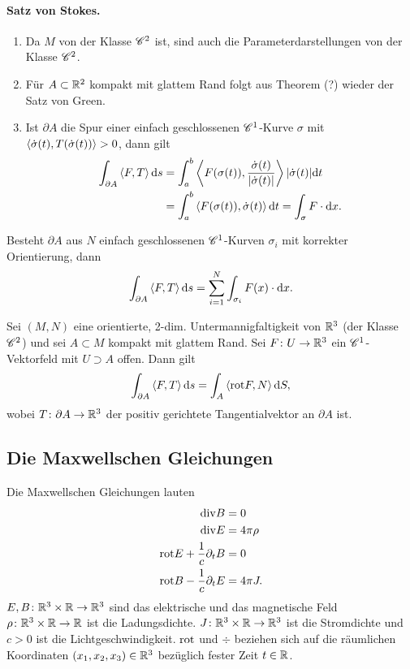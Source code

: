 \paragraph{Satz von Stokes. } 
\begin{rem}
	\begin{enumerate}[label=(\arabic*)]
		\item Da $M$ von der Klasse $\mathscr{C}^2$ ist, sind auch die Parameterdarstellungen von der Klasse $\mathscr{C}^2$.
		\item Für $A \subset \mathbb{R}^2$ kompakt mit glattem Rand folgt aus Theorem (?) wieder der Satz von Green.
		\item Ist $\partial A$ die Spur einer einfach geschlossenen $\mathscr{C}^1$-Kurve $\sigma$ mit $\left\langle\dot{\sigma}(t),T(\dot{\sigma}(t)) \right\rangle > 0$, dann gilt
		\begin{align*}
			\int_{\partial A} \left\langle F,T \right\rangle \mathrm{d} s &= 
			\int_a^b \left\langle F(\sigma(t)),\frac{\dot{\sigma}(t)}{|\dot{\sigma}(t)|} \right\rangle  |\dot{\sigma}(t)| \mathrm{d} t\\ &= 
			\int_a^b \left\langle F(\sigma(t)),\dot{\sigma}(t) \right\rangle \mathrm{d} t= \int_\sigma F \cdot \mathrm{d} x.
		\end{align*}
	\end{enumerate}
\end{rem}
Besteht $\partial A$ aus $N$ einfach geschlossenen $\mathscr{C}^1$-Kurven $\sigma_i$ mit korrekter Orientierung, dann 
\[\int_{\partial A} \left\langle F,T \right\rangle \mathrm{d} s = \sum_{i=1}^N \int_{\sigma_i} F(x) \cdot \mathrm{d} x.\]
\begin{thm}[Stokes 1854]\label{thm3_29}
	Sei $(M,N)$ eine orientierte, 2-dim. Untermannigfaltigkeit von $\mathbb{R}^3$ (der Klasse $\mathscr{C}^2$) und sei $A \subset M$ kompakt mit glattem Rand. Sei $F \colon U \to \mathbb{R}^3$ ein $\mathscr{C}^1$-Vektorfeld mit $U \supset A$ offen. Dann gilt
	\[\int_{\partial A} \left\langle F,T \right\rangle \mathrm{d} s = \int_A \left\langle\mathrm{rot} F,N \right\rangle \mathrm{d} S,\]
	wobei $T \colon \partial A \to \mathbb{R}^3$ der positiv gerichtete Tangentialvektor an $\partial A$ ist.
\end{thm}

\subsection{Die Maxwellschen Gleichungen}
Die Maxwellschen Gleichungen lauten
\begin{align}
	\mathrm{div} B &= 0\label{maxwell1}\\
	\mathrm{div} E &= 4 \pi \rho \label{maxwell2}\\
	\mathrm{rot} E + \frac{1}{c} \partial_t B &= 0\label{maxwell3}\\
	\mathrm{rot} B - \frac{1}{c} \partial_t E &= 4\pi J\label{maxwell4}.
\end{align}
$E,B \colon \mathbb{R}^3 \times \mathbb{R} \to \mathbb{R}^3$ sind das elektrische und das magnetische Feld $\rho \colon \mathbb{R}^3\times \mathbb{R} \to \mathbb{R}$ ist die Ladungsdichte. $J \colon \mathbb{R}^3\times \mathbb{R} \to \mathbb{R}^3$ ist die Stromdichte und $c > 0$ ist die Lichtgeschwindigkeit. $\mathrm{rot}$ und $\div$ beziehen sich auf die räumlichen Koordinaten $(x_1, x_2, x_3) \in \mathbb{R}^3$ bezüglich fester Zeit $t\in \mathbb{R}$.


